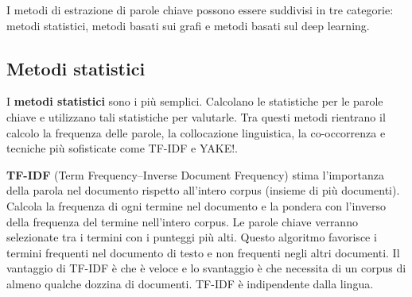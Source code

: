 I metodi di estrazione di parole chiave possono essere suddivisi in tre categorie: metodi statistici, metodi basati sui grafi e metodi basati sul deep learning\cite{extraction}.

\subsection{Metodi statistici}
I \textbf{metodi statistici} sono i più semplici. Calcolano le statistiche per le parole chiave e utilizzano tali statistiche per valutarle. Tra questi metodi rientrano il calcolo la frequenza delle parole, la collocazione linguistica, la co-occorrenza e tecniche più sofisticate come TF-IDF e YAKE!.

\textbf{TF-IDF} (Term Frequency–Inverse Document Frequency) stima l'importanza della parola nel documento rispetto all'intero corpus (insieme di più documenti). Calcola la frequenza di ogni termine nel documento e la pondera con l'inverso della frequenza del termine nell'intero corpus. Le parole chiave verranno selezionate tra i termini con i punteggi più alti. Questo algoritmo favorisce i termini frequenti nel documento di testo e non frequenti negli altri documenti. Il vantaggio di TF-IDF è che è veloce e lo svantaggio è che necessita di un corpus di almeno qualche dozzina di documenti. TF-IDF è indipendente dalla lingua.

